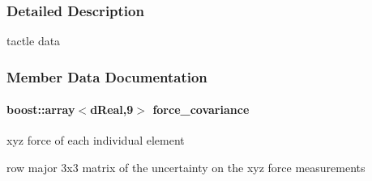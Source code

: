 \subsubsection{Detailed Description}
tactle data 

\subsubsection{Member Data Documentation}
\hypertarget{classOpenRAVE_1_1SensorBase_1_1TactileSensorData_a972c8980eeb77603fbda2827c16ae213}{
\paragraph[{force\_\-covariance}]{\setlength{\rightskip}{0pt plus 5cm}boost::array$<$dReal,9$>$ {\bf force\_\-covariance}}\hfill}
\label{classOpenRAVE_1_1SensorBase_1_1TactileSensorData_a972c8980eeb77603fbda2827c16ae213}


xyz force of each individual element 

row major 3x3 matrix of the uncertainty on the xyz force measurements 